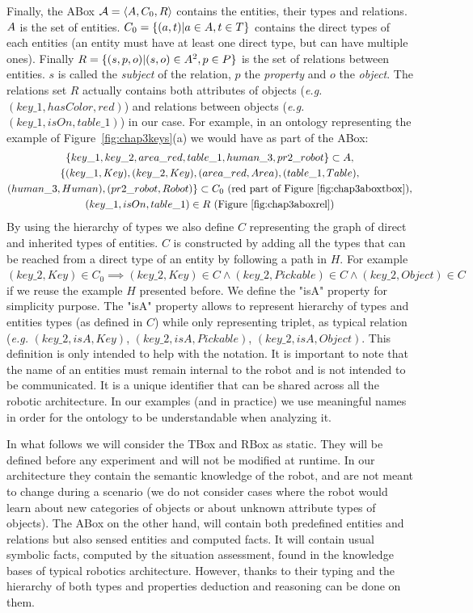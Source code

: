 \documentclass[a4paper,11pt,twoside]{StyleThese}
\begin{document}
Finally, the ABox $\mathcal{A} = \langle A, C_0, R \rangle$ contains the entities, their types and relations. $A$ is the set of entities. $C_0 = \{(a, t)|a \in A, t \in T\}$ contains the direct types of each entities (an entity must have at least one direct type, but can have multiple ones). Finally $R = \{(s, p, o)|(s, o) \in A^2, p \in P\}$ is the set of relations between entities. $s$ is called the \textit{subject} of the relation, $p$ the \textit{property} and $o$ the \textit{object}. The relations set $R$ actually contains both attributes of objects (\textit{e.g.} $(key\_1, hasColor, red)$) and relations between objects (\textit{e.g.} $(key\_1, isOn, table\_1)$) in our case. For example, in an ontology representing the example of Figure~\ref{fig:chap3keys}(a) we would have as part of the ABox: 
\begin{multline*}
\{key\_1, key\_2, area\_red, table\_1, human\_3, pr2\_robot\} \subset A,\\
\{(key\_1, Key), (key\_2, Key), (area\_red, Area), (table\_1, Table),\\
(human\_3, Human), (pr2\_robot, Robot)\} \subset C_0 \text{ (red part of Figure~\ref{fig:chap3aboxtbox})},\\
(key\_1, isOn, table\_1) \in R \text{ (Figure~\ref{fig:chap3aboxrel})}
\end{multline*}
By using the hierarchy of types we also define $C$ representing the graph of direct and inherited types of entities. $C$ is constructed by adding all the types that can be reached from a direct type of an entity by following a path in $H$. For example $(key\_2, Key) \in C_0 \implies (key\_2, Key) \in C \land (key\_2, Pickable) \in C \land (key\_2, Object) \in C$ if we reuse the example $H$ presented before.
We define the "isA" property for simplicity purpose. The "isA" property allows to represent hierarchy of types and entities types (as defined in $C$) while only representing triplet, as typical relation (\textit{e.g.} $(key\_2, isA, Key)$, $(key\_2, isA, Pickable)$, $(key\_2, isA, Object)$. This definition is only intended to help with the notation.
It is important to note that the name of an entities must remain internal to the robot and is not intended to be communicated. It is a unique identifier that can be shared across all the robotic architecture. In our examples (and in practice) we use meaningful names in order for the ontology to be understandable when analyzing it.

In what follows we will consider the TBox and RBox as static. They will be defined before any experiment and will not be modified at runtime. In our architecture they contain the semantic knowledge of the robot, and are not meant to change during a scenario (we do not consider cases where the robot would learn about new categories of objects or about unknown attribute types of objects). The ABox on the other hand, will contain both predefined entities and relations but also sensed entities and computed facts. It will contain usual symbolic facts, computed by the situation assessment, found in the knowledge bases of typical robotics architecture. However, thanks to their typing and the hierarchy of both types and properties deduction and reasoning can be done on them.
\end{document}
